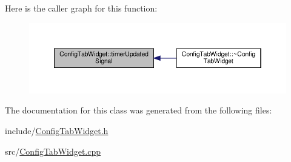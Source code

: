 Here is the caller graph for this function\+:
\nopagebreak
\begin{figure}[H]
\begin{center}
\leavevmode
\includegraphics[width=350pt]{class_config_tab_widget_abad08be885f5a573aaf03da16bcd69ef_icgraph}
\end{center}
\end{figure}


The documentation for this class was generated from the following files\+:\begin{DoxyCompactItemize}
\item 
include/\hyperlink{_config_tab_widget_8h}{Config\+Tab\+Widget.\+h}\item 
src/\hyperlink{_config_tab_widget_8cpp}{Config\+Tab\+Widget.\+cpp}\end{DoxyCompactItemize}
